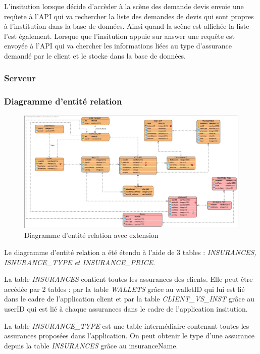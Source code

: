 \documentclass[../rapport.tex]{subfiles}
\begin{document}
				L'insitution lorsque décide d'accèder à la scène des demande devis envoie une
				reqûete à l'API qui va rechercher la liste des demandes de devis qui sont propres
				à l'institution dans la base de données. Ainsi quand la scène est affichée la 
				liste l'est également. Lorsque que l'insitution appuie sur answer une requête est
				envoyée à l'API qui va chercher les informations liées au type d'assurance demandé
				par le client et le stocke dans la base de données.
		\subsubsection{Serveur}
		\subsubsection{Diagramme d'entité relation}

				\begin{figure}[h]
						\centering\includegraphics[scale=0.25]{ressources/photos_diagrammes/extensionThomas/erdThomas.jpg}
						\caption{Diagramme d'entité relation avec extension}
				\end{figure}
		Le diagramme d'entité relation a été étendu à l'aide de 3 tables : \textit{INSURANCES, ISNURANCE\_TYPE et INSURANCE\_PRICE}.
				
		\medskip

		La table \textit{INSURANCES} contient toutes les assurances des clients. Elle peut être accédée par 2 tables : par la table \textit{WALLETS} grâce au walletID qui lui est lié dans le cadre de l'application client et par la table \textit{CLIENT\_VS\_INST} grâce au userID qui est lié à chaque assurances dans le cadre de l'application insitution.

		\medskip

		La table \textit{INSURANCE\_TYPE} est une table intermédiaire contenant toutes les assurances proposées dans l'application. On peut obtenir le type d'une assurance depuis la table \textit{INSURANCES} grâce au insuranceName.
\end{document}

